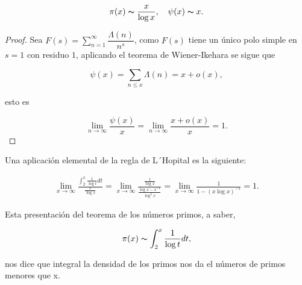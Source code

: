 \begin{corollary}
$$\pi(x)\thicksim \frac{x}{\log x},\quad \psi(x)\thicksim x.$$
\end{corollary}

\begin{proof}
    Sea $F(s)=\displaystyle\sum_{n=1}^{\infty} \dfrac{\Lambda(n)}{n^s}$, como $F(s)$ tiene un único polo simple en $s=1$ con residuo $1$, aplicando el teorema de Wiener-Ikehara se sigue que

    $$\psi(x)=\sum_{n\leq x} \Lambda(n)=x+o(x),$$

    esto es

    $$\lim_{n \to \infty} \frac{\psi(x)}{x}=\lim_{n \to \infty} \frac{x+o(x)}{x}=1.$$
\end{proof}

\begin{note}
Una aplicación elemental de la regla de L´Hopital es la siguiente:

\begin{align*}
    \displaystyle\lim_{x \to \infty} \frac{\displaystyle\int_2^x \displaystyle\frac{1}{\log t}dt}{\displaystyle\frac{x}{\log x}}=\lim_{x \to \infty} \frac{\displaystyle\frac{1}{\log x}}{\displaystyle\frac{\log x-x^{-1}}{\log^2x}}=\lim_{x \to \infty} \frac{1}{1-(x\log x)^{-1}}=1
.\end{align*}

Esta presentación del teorema de los números primos, a saber,

$$\pi(x)\thicksim \int_2^x\frac{1}{\log t}dt,$$

nos dice que integral la densidad de los primos nos da el números de primos menores que x.
\end{note}